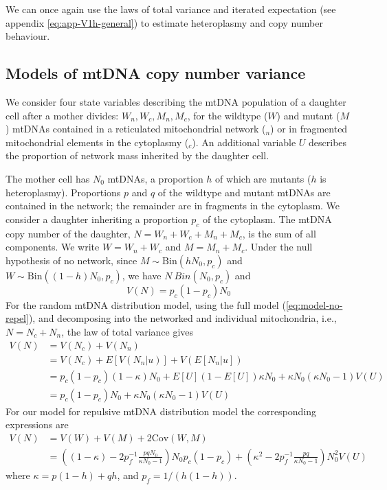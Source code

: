 \documentclass{article}
\begin{document}
We can once again use the laws of total variance and iterated expectation  (see appendix \ref{eq:app-V1h-general}) to estimate heteroplasmy and copy number behaviour.



\clearpage
\newpage

\begin{appendices}
\section{Models of mtDNA copy number variance}
 We consider four state variables describing the mtDNA population of a daughter cell after a mother divides: $W_n, W_c, M_n, M_c$, for the wildtype ($W$) and mutant ($M$) mtDNAs contained in a reticulated mitochondrial network (${}_n$) or in fragmented mitochondrial elements in the cytoplasmy (${}_c$). An additional variable $U$ describes the proportion of network mass inherited by the daughter cell.

The mother cell has $N_0$ mtDNAs, a proportion $h$ of which are mutants ($h$ is heteroplasmy). Proportions $p$ and $q$ of the wildtype and mutant mtDNAs are contained in the network; the remainder are in fragments in the cytoplasm. 
We consider a daughter inheriting a proportion $p_c$ of the cytoplasm. The mtDNA copy number of the daughter, $N = W_n+W_c+M_n+M_c$, is the sum of all components. We write $W = W_n + W_c$ and $M = M_n+M_c$. Under the null hypothesis of no network, since $M\sim \mathrm{Bin}(hN_0,p_c)$ and $W\sim\mathrm{Bin}((1-h)N_0,p_c)$, we have $N ~ Bin(N_0, p_c)$ and 
\begin{equation}\label{eq:app_mtCN_null}
    V(N)=p_c(1-p_c)N_0
\end{equation}
For the random mtDNA distribution model, using the full model (\ref{eq:model-no-repel}), and decomposing into the networked and individual mitochondria, i.e., $N=N_c+N_n$, the law of total variance gives
\begin{equation}
    \begin{split}
    V(N)&=V(N_c)+V(N_n)\\
         &=V(N_c)+E[V(N_n|u)]+V(E[N_n|u])\\
         &= p_c(1-p_c)(1-\kappa)N_0
          + E[U](1-E[U])\kappa N_0+\kappa N_0(\kappa N_0-1)V(U)\\
         &=p_c(1-p_c)N_0+\kappa N_0(\kappa N_0-1)V(U)
    \end{split}
\end{equation}
For our model for repulsive mtDNA distribution model the corresponding expressions are
\begin{equation}
    \begin{split}
    V(N)&=V(W)+V(M)+2\mathrm{Cov}(W,M)\\
         &=\left((1-\kappa)-2p_f^{-1}\frac{pqN_0}{\kappa N_0-1}\right)N_0p_c(1-p_c)
         +\left(\kappa^2-2p_f^{-1}\frac{pq}{\kappa N_0-1}\right)N_0^2V(U)
    \end{split}
\end{equation}
where $\kappa = p(1-h)+qh$, and $p_f=1/(h(1-h))$. 


\end{appendices}
\end{document}
